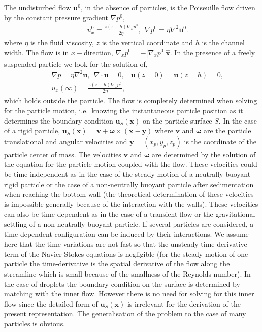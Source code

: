 The undisturbed flow $\bm u^0$, in the absence of  particles, is the Poiseuille flow driven by the constant pressure gradient $\nabla p^0$,
\begin{eqnarray}&&
u^0_x=\frac{z(z-h)\nabla_x p^0}{2\eta},\ \ \nabla p^0=\eta\nabla^2\bm u^0.\label{ps}
\end{eqnarray}
where $\eta$ is the fluid viscosity, $z$ is the vertical coordinate and $h$ is the channel width. The flow is in $x-$direction, $\nabla_x p^0=-|\nabla_x p^0| \bm{\hat x}$. In the presence of a freely suspended particle we look for the solution of,
\begin{eqnarray}&&%
\nabla p=\eta\nabla^2\bm u,\ \ \nabla\cdot\bm u=0,\ \ \ \ \bm u(z=0)=\bm u(z=h)=0,\nonumber\\&&%
u_x(\infty)=\frac{z(z-h)\nabla_x p^0}{2\eta},
\label{ds}
\end{eqnarray}
which holds outside the particle. The flow is completely determined when solving for the particle motion, i.e.\ knowing the instantaneous particle position as it determines the boundary condition $\bm u_{S}(\bm x)$ on the 
 particle surface $S$. In the case of a rigid particle, $\bm u_{S}(\bm x)=\bm v+\bm \omega\times (\bm x-\bm y)$ where $\bm v$ and $
\bm \omega$ are the particle translational and angular velocities  and $\bm y=(x_p, y_p, z_p)$ is the coordinate of the particle center of mass. The velocities $\bm v$ and $\bm \omega$ are determined by the solution of the equation for the particle motion coupled with the flow. These velocities could be time-independent as in the case of the steady motion of a neutrally buoyant rigid particle or the case of a non-neutrally buoyant particle after sedimentation when reaching the bottom wall (the theoretical determination of these velocities is impossible generally because of the interaction with the walls). These velocities can also be time-dependent as in the case of
a transient flow  or the gravitational settling of a non-neutrally buoyant particle. If several particles are considered, a time-dependent configuration can be induced by their interactions. We assume here that the time variations are not fast so that the unsteady time-derivative term of the Navier-Stokes equations is negligible (for the steady motion of one particle the time-derivative is the spatial derivative of the flow along the streamline which is small  because of the smallness of the Reynolds number). In the case of droplets the boundary condition on the surface is determined by matching with the inner flow. However there is no need for solving for this inner flow since the detailed form of $\bm u_{S}(\bm x)$ is irrelevant for the derivation of the present representation. The generalisation of the problem to the case of many particles is obvious.

